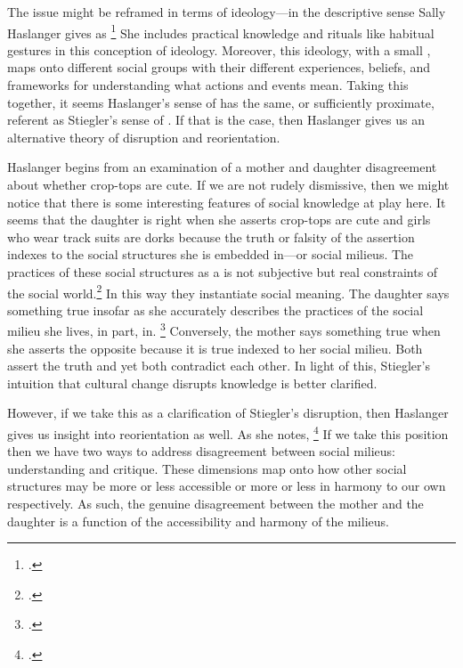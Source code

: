 \documentclass[letterpaper,notitlepage,12pt]{article}
\begin{document}
{The issue might be reframed in terms of ideology---in the descriptive sense
Sally Haslanger gives as \footcite[p. 75]{haslanger_but_2007}
She includes practical knowledge and rituals like habitual gestures in this
conception of ideology.
Moreover, this ideology, with a small , maps onto different social
groups with their different experiences, beliefs, and frameworks for
understanding what actions and events mean.
Taking this together, it seems Haslanger's sense of  has the 
same, or sufficiently proximate, referent as Stiegler's sense of
.
If that is the case, then Haslanger gives us an alternative theory of disruption
and reorientation.

Haslanger begins from an examination of a mother and daughter disagreement about
whether crop-tops are cute.
If we are not rudely dismissive, then we might notice that there is some
interesting features of social knowledge at play here.
It seems that the daughter is right when she asserts crop-tops are cute and
girls who wear track suits are dorks because the truth or falsity of the
assertion indexes to the social structures she is embedded in---or social
milieus.
The practices of these social structures as a  is not subjective but real constraints of the social 
world.\footcite[p. 79]{haslanger_but_2007}
In this way they instantiate social meaning.
The daughter says something true insofar as she accurately describes the
practices of the social milieu she lives, in part, in.
\footcite[p. 81]{haslanger_but_2007}
Conversely, the mother says something true when she asserts the opposite because
it is true indexed to her social milieu.
Both assert the truth and yet both contradict each other.
In light of this, Stiegler's intuition that cultural change disrupts knowledge
is better clarified.

However, if we take this as a clarification of Stiegler's disruption, then
Haslanger gives us insight into reorientation as well.
As she notes, \footcite[p. 81]{haslanger_but_2007}
If we take this position then we have two ways to address disagreement between
social milieus: understanding and critique. These dimensions map onto how other
social structures may be more or less accessible or more or less in harmony to
our own respectively. As such, the genuine disagreement between the mother and
the daughter is a function of the accessibility and harmony of the milieus.

}
\end{document}
